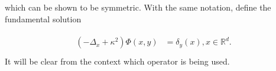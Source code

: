 \documentclass[paper=a4, fontsize=11pt]{scrartcl} %
\numberwithin{equation}{section} %
\numberwithin{figure}{section} %
\numberwithin{table}{section} %
\begin{document}
which can be shown to be symmetric. With the same notation, define the fundamental solution

\begin{align}
  \begin{split}
    (-\Delta_{x} + \kappa^2) \Phi(x,y) &= \delta_{y}(x), x \in \mathbb{R}^d. \\
  \end{split}
\end{align}
It will be clear from the context which operator is being used.

\end{document}
